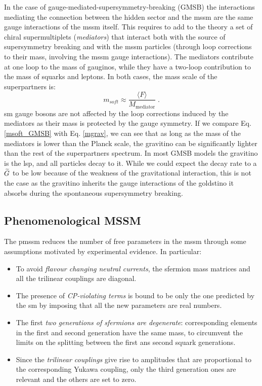 In the case of gauge-mediated-supersymmetry-breaking (GMSB) \cite{Dine:1981gu, AlvarezGaume:1981wy, Nappi:1982hm, PhysRevD.48.1277, Dine:1994vc, Dine:1995ag} the interactions mediating the connection between the hidden sector and the \gls{mssm} are the same gauge interactions of the \gls{mssm} itself. This requires to add to the theory a set of chiral supermultiplets (\textit{mediators}) that interact both with the source of supersymmetry breaking and with the \gls{mssm} particles (through loop corrections to their mass, involving the \gls{mssm} gauge interactions). The mediators contribute at one loop to the mass of gauginos, while they have a two-loop contribution to the mass of squarks and leptons. In both cases, the mass scale of the superpartners is:
\begin{equation}
m_{soft} \approx \frac{\langle F \rangle}{M_\mathrm{mediator}} \; .
\label{msoft_GMSB}
\end{equation}
\gls{sm} gauge bosons are not affected by the loop corrections induced by the mediators as their mass is protected by the gauge symmetry.
If we compare Eq. \ref{msoft_GMSB} with Eq. \ref{mgrav}, we can see that as long as the mass of the mediators is lower than the Planck scale, the gravitino can be significantly lighter than the rest of the superpartners spectrum. In most GMSB models the gravitino is the \gls{lsp}, and all particles decay to it. While we could expect the decay rate to a $\widetilde{G}$ to be low because of the weakness of the gravitational interaction, this is not the case as the gravitino inherits the gauge interactions of the goldstino it absorbs during the spontaneous supersymmetry breaking.  


\subsection{Phenomenological MSSM}
\label{sec:theory:pmssm}

The \gls{pmssm} \cite{Djouadi:1998di} reduces the number of free parameters in the \gls{mssm} through some assumptions motivated by experimental evidence. In particular:
\begin{itemize}
\item To avoid \textit{flavour changing neutral currents}, the sfermion mass matrices and all the trilinear couplings are diagonal. 
\item The presence of \textit{CP-violating terms} is bound to be only the one predicted by the \gls{sm} by imposing that all the new parameters are real numbers.
\item The first \textit{two generations of sfermions are degenerate}: corresponding elements in the first and second generation have the same mass, to circumvent the limits on the splitting between the first ans second squark generations.
\item Since the \textit{trilinear couplings} give rise to amplitudes that are proportional to the corresponding Yukawa coupling, only the third generation ones are relevant and the others are set to zero.
\end{itemize}


